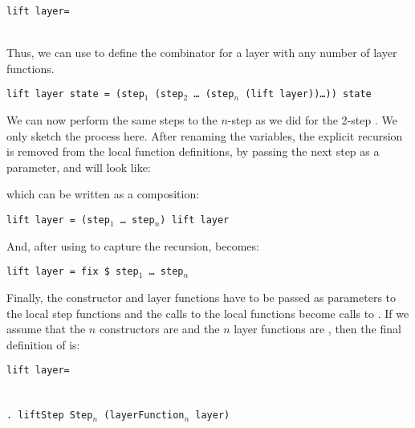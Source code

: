 \documentclass[preprint,natbib]{sigplanconf}
\begin{document}
\begin{small}
\begin{tabbing}
{\tt li}\={\tt ft l}\={\tt ayer= }\\
\\
\end{tabbing}
\end{small}

Thus, we can use   to define the  combinator for a layer with any number of layer functions.

\bc
\begin{tabbing}
{\tt l}\={\tt ift layer state = (step$_1$ (step$_2$ \dots ~(step$_n$ (lift layer))\dots)) state}\\
\end{tabbing}

We can now perform the same steps to the $n$-step  as we did for the 2-step . We only sketch the process here. After renaming the variables, the explicit recursion is removed from the local function definitions, by passing the next step as a parameter, and  will look like:


which can be written as a composition:

\begin{tabbing}
{\tt l}\={\tt ift layer = (step$_1$ \dots ~step$_n$) lift layer}\\
\end{tabbing}

And, after using  to capture the recursion, becomes:

\begin{tabbing}
{\tt l}\={\tt ift layer = fix \$ step$_1$ \dots ~step$_n$}\\
\end{tabbing}



Finally, the constructor and layer functions have to be passed as parameters to the local step functions and the calls to the local functions become calls to . If we assume that the $n$ constructors are  and the $n$ layer functions are , then the final definition of  is:

\begin{tabbing}
{\tt li}\={\tt ft l}\={\tt ayer= }\\
\\
\>\\ 
\>\>\verb|. lift|{\tt Step Step$_n$ (layerFunction$_n$ layer)}
\end{tabbing}
\end{document}
